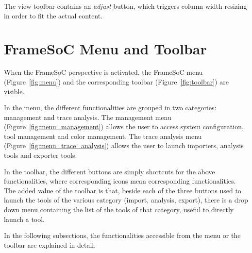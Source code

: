 \documentclass[twoside]{article}
\begin{document}
\begin{sloppypar}
The view toolbar contains an \emph{adjust} button, which triggers column width resizing in order to fit the actual content.

\section{FrameSoC Menu and Toolbar}
\label{sec:menu}

When the FrameSoC perspective is activated, the FrameSoC menu (Figure~\ref{fig:menu}) and the corresponding toolbar (Figure~\ref{fig:toolbar}) are visible. 

In the menu, the different functionalities are grouped in two categories: management and trace analysis.
The management menu (Figure~\ref{fig:menu_management}) allows the user to access system configuration, tool management and color management.
The trace analysis menu (Figure~\ref{fig:menu_trace_analysis}) allows the user to launch importers, analysis tools and exporter tools.

In the toolbar, the different buttons are simply shortcuts for the above functionalities, where corresponding icons mean corresponding functionalities.
The added value of the toolbar is that, beside each of the three buttons used to launch the tools of the various category (import, analysis, export), there is a drop down menu containing the list of the tools of that category, useful to directly launch a tool.

In the following subsections, the functionalities accessible from the menu or the toolbar are explained in detail.


\end{sloppypar}
\end{document}
